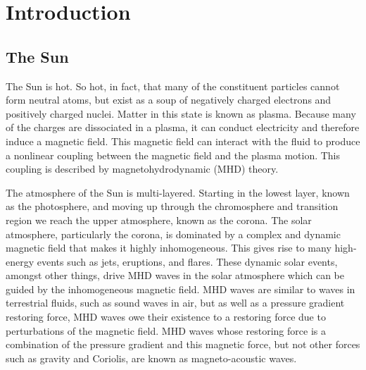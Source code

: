 \documentclass[12pt]{../style-files/ociamthesis}
\begin{document}
\baselineskip=18pt

\setcounter{secnumdepth}{3}
\setcounter{tocdepth}{3}

\newcommand{\bv}{\mathbf{v}}
\newcommand{\bB}{\mathbf{B}}


\chapter{Introduction}
\label{chap:intro}

\section{The Sun}
\label{sec: sun}

The Sun is hot. So hot, in fact, that many of the constituent particles cannot form neutral atoms, but exist as a soup of negatively charged electrons and positively charged nuclei. Matter in this state is known as plasma. Because many of the charges are dissociated in a plasma, it can conduct electricity and therefore induce a magnetic field. This magnetic field can interact with the fluid to produce a nonlinear coupling between the magnetic field and the plasma motion. This coupling is described by
magnetohydrodynamic (MHD) theory.

The atmosphere of the Sun is multi-layered. Starting in the lowest layer, known as the photosphere, and moving up through the chromosphere and transition region we	reach the upper atmosphere, known as the corona. The solar atmosphere, particularly the corona, is dominated by a complex and dynamic magnetic field that makes it	highly inhomogeneous. This gives rise to many high-energy events such as jets, eruptions, and flares. These dynamic solar events, amongst other things, drive MHD waves in the solar atmosphere which can be guided by the inhomogeneous magnetic field. MHD waves are similar to waves in terrestrial fluids, such as sound waves in air, but as well as a pressure gradient restoring force, MHD waves owe their existence to a restoring force due to perturbations of the magnetic field. MHD waves whose restoring force is a combination of the pressure gradient and this magnetic force, but not other forces such as gravity and Coriolis, are known as magneto-acoustic waves.
\end{document}
